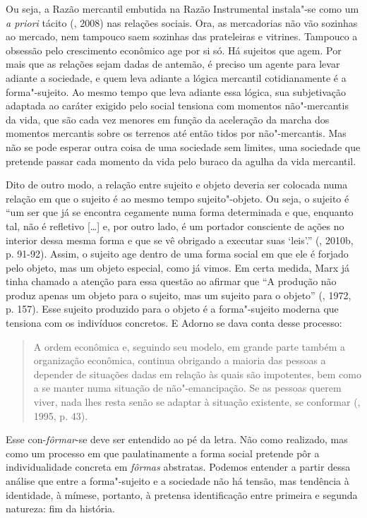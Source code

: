 Ou seja, a Razão mercantil embutida na Razão Instrumental instala"-se
como um \emph{a priori} tácito (, 2008) nas relações sociais. Ora,
as mercadorias não vão sozinhas ao mercado, nem tampouco saem sozinhas
das prateleiras e vitrines. Tampouco a obsessão pelo crescimento
econômico age por si só. Há sujeitos que agem. Por mais que as relações
sejam dadas de antemão, é preciso um agente para levar adiante a
sociedade, e quem leva adiante a lógica mercantil cotidianamente é a
forma"-sujeito. Ao mesmo tempo que leva adiante essa lógica, sua
subjetivação adaptada ao caráter exigido pelo social tensiona com
momentos não"-mercantis da vida, que são cada vez menores em função da
aceleração da marcha dos momentos mercantis sobre os terrenos até então
tidos por não"-mercantis. Mas não se pode esperar outra coisa de uma
sociedade sem limites, uma sociedade que pretende passar cada momento da
vida pelo buraco da agulha da vida mercantil.

Dito de outro modo, a relação entre sujeito e objeto deveria ser
colocada numa relação em que o sujeito é ao mesmo tempo sujeito"-objeto.
Ou seja, o sujeito é ``um ser que já se encontra cegamente numa forma
determinada e que, enquanto tal, não é refletivo [\ldots{}] e, por outro
lado, é um portador consciente de ações no interior dessa mesma forma e
que se vê obrigado a executar suas `leis'.'' (, 2010b, p. 91-92).
Assim, o sujeito age dentro de uma forma social em que ele é forjado
pelo objeto, mas um objeto especial, como já vimos. Em certa medida,
Marx já tinha chamado a atenção para essa questão ao afirmar que ``A
produção não produz apenas um objeto para o sujeito, mas um sujeito para
o objeto'' (, 1972, p. 157). Esse sujeito produzido para o objeto é
a forma"-sujeito moderna que tensiona com os indivíduos concretos. E
Adorno se dava conta desse processo:

\begin{quote}
A ordem econômica e, seguindo seu modelo, em grande parte também a
organização econômica, continua obrigando a maioria das pessoas a
depender de situações dadas em relação às quais são impotentes, bem como
a se manter numa situação de não"-emancipação. Se as pessoas querem
viver, nada lhes resta senão se adaptar à situação existente, se
conformar (, 1995, p. 43).
\end{quote}

Esse con-\emph{fôrmar}-se deve ser entendido ao pé da letra. Não como
realizado, mas como um processo em que paulatinamente a forma social
pretende pôr a individualidade concreta em \emph{fôrmas} abstratas.
Podemos entender a partir dessa análise que entre a forma"-sujeito e a
sociedade não há tensão, mas tendência à identidade, à mímese, portanto,
à pretensa identificação entre primeira e segunda natureza: fim da
história.

